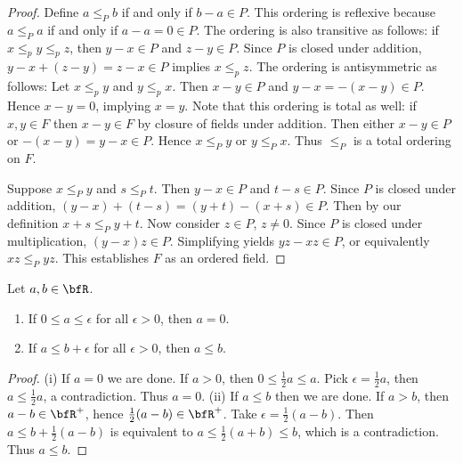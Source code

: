 \documentclass[10pt,twoside,openany]{memoir}
\begin{document}
        \begin{proof}
            Define $a \leq_P b$ if and only if $b - a \in P$. This ordering is reflexive because $a \leq_P a$ if and only if $a - a = 0 \in P$. The ordering is also transitive as follows: if $x \leq_p y \leq_p z$, then $y-x \in P$ and $z - y \in P$. Since $P$ is closed under addition, $y-x + (z-y) = z - x \in P$ implies $x \leq_p z$. The ordering is antisymmetric as follows: Let $x \leq_p y$ and $y \leq_p x$. Then $x-y \in P$ and $y-x = -(x-y) \in P$. Hence $x-y = 0$, implying $x = y$. Note that this ordering is total as well: if $x,y\in F$ then $x-y \in F$ by closure of fields under addition. Then either $x-y \in P$ or $-(x-y)=y-x \in P$. Hence $x \leq_P y$ or $y \leq_P x$. Thus $\leq_P$ is a total ordering on $F$. 
            
            
            
            
            Suppose $x \leq_P y$ and $s \leq_P t$. Then $y-x \in P$ and $t-s \in P$. Since $P$ is closed under addition, $(y-x) + (t-s) = (y+t) - (x + s) \in P$. Then by our definition $x + s \leq_P y+t$. Now consider $z \in P$, $z \neq 0$. Since $P$ is closed under multiplication, $(y-x)z \in P$. Simplifying yields $yz - xz \in P$, or equivalently $xz \leq_P yz$. This establishes $F$ as an ordered field.
        \end{proof}
    \begin{exercise}
        Let $a,b \in \bfR$.
            \begin{enumerate}[label = (\roman*)]
                \item If $0 \leq a \leq \epsilon$ for all $\epsilon > 0$, then $a = 0$.
                \item If $a \leq b + \epsilon$ for all $\epsilon > 0 $, then $a \leq b$.
            \end{enumerate}
    \end{exercise}
        \begin{proof}
            (i) If $a = 0$ we are done. If $a > 0$, then $0 \leq \frac{1}{2}a \leq a$. Pick $\epsilon = \frac{1}{2}a$, then $a \leq \frac{1}{2}a$, a contradiction. Thus $a = 0$. (ii) If $a \leq b$ then we are done. If $a > b$, then $a-b \in \bfR^+$, hence $\frac{1}{2}(a-b) \in \bfR^+$. Take $\epsilon = \frac{1}{2}(a-b)$. Then $a \leq b + \frac{1}{2}(a-b)$ is equivalent to $a \leq \frac{1}{2}(a+b) \leq b$, which is a contradiction. Thus $a \leq b$.
        \end{proof}
\end{document}

